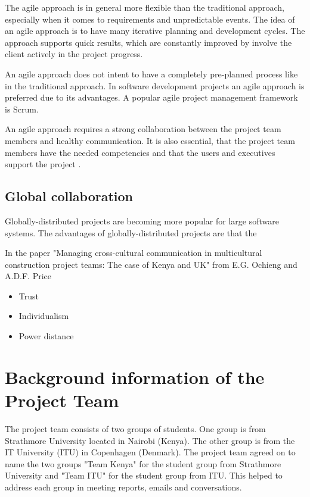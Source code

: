 The agile approach is in general more flexible than the traditional approach, especially when it comes to requirements and unpredictable events. The idea of an agile approach is to have many iterative planning and development cycles. The approach supports quick results, which are constantly improved by involve the client actively in the project progress.

An agile approach does not intent to have a completely pre-planned process like in the traditional approach. In software development projects an agile approach is preferred due to its advantages. A popular agile project management framework is Scrum.

An agile approach requires a strong collaboration between the project team members and healthy communication. It is also essential, that the project team members have the needed competencies and that the users and executives support the project .

\subsection{Global collaboration} 
Globally-distributed projects are becoming more popular for large software systems. The advantages of globally-distributed projects are that the

In the paper "Managing cross-cultural communication in multicultural construction project teams: The case of Kenya and UK" from E.G. Ochieng and A.D.F. Price

	\begin{itemize}
		\item Trust
		\item Individualism
		\item Power distance
	\end{itemize}


\section{Background information of the Project Team}
The project team consists of two groups of students. One group is from Strathmore University located in Nairobi (Kenya). The other group is from the IT University (ITU) in Copenhagen (Denmark). The project team agreed on to name the two groups "Team Kenya" for the student group from Strathmore University and "Team ITU" for the student group from ITU. This helped to address each group in meeting reports, emails and conversations.


